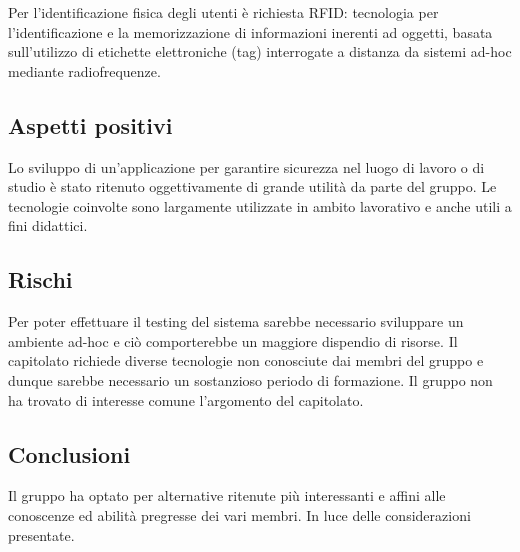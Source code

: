 \documentclass[../studio-di-fattibilita.tex]{subfiles}
\begin{document}
Per l’identificazione fisica degli utenti è richiesta RFID: tecnologia per l’identificazione e la memorizzazione di informazioni inerenti ad oggetti, basata sull’utilizzo di etichette elettroniche (tag) interrogate a distanza da sistemi ad-hoc mediante radiofrequenze.

\subsection{Aspetti positivi}%
\label{sub:c1_aspetti_positivi}
Lo sviluppo di un’applicazione per garantire sicurezza nel luogo di lavoro o di studio è stato ritenuto oggettivamente di grande utilità da parte del gruppo.
Le tecnologie coinvolte sono largamente utilizzate in ambito lavorativo e anche utili a fini didattici.

\subsection{Rischi}%
\label{sub:c1_rischi}
Per poter effettuare il testing del sistema sarebbe necessario sviluppare un ambiente ad-hoc e ciò comporterebbe un maggiore dispendio di risorse.
Il capitolato richiede diverse tecnologie non conosciute dai membri del gruppo e dunque sarebbe necessario un sostanzioso periodo di formazione.
Il gruppo non ha trovato di interesse comune l’argomento del capitolato.

\subsection{Conclusioni}%
\label{sub:c1_Conclusioni}
Il gruppo ha optato per alternative ritenute più interessanti e affini alle conoscenze ed abilità pregresse dei vari membri. In luce delle considerazioni presentate.
\end{document}
